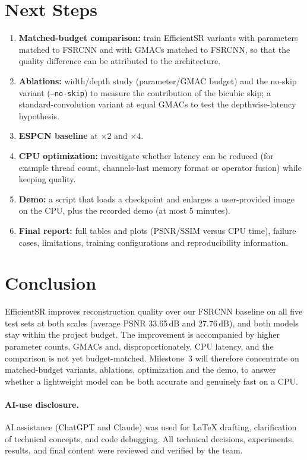 \documentclass[11pt]{article}
\begin{document}
\section{Next Steps}
\label{sec:next}
\begin{enumerate}
    \item \textbf{Matched-budget comparison:} train EfficientSR variants with parameters matched to FSRCNN and with GMACs matched to FSRCNN, so that the quality difference can be attributed to the architecture.
    \item \textbf{Ablations:} width/depth study (parameter/GMAC budget) and the no-skip variant (\texttt{--no-skip}) to measure the contribution of the bicubic skip; a standard-convolution variant at equal GMACs to test the depthwise-latency hypothesis.
    \item \textbf{ESPCN baseline} at $\times2$ and $\times4$.
    \item \textbf{CPU optimization:} investigate whether latency can be reduced (for example thread count, channels-last memory format or operator fusion) while keeping quality.
    \item \textbf{Demo:} a script that loads a checkpoint and enlarges a user-provided image on the CPU, plus the recorded demo (at most 5 minutes).
    \item \textbf{Final report:} full tables and plots (PSNR/SSIM versus CPU time), failure cases, limitations, training configurations and reproducibility information.
\end{enumerate}

\section{Conclusion}
\label{sec:conclusion}
EfficientSR improves reconstruction quality over our FSRCNN baseline on all five test sets at both scales (average PSNR 33.65\,dB and 27.76\,dB), and both models stay within the project budget. The improvement is accompanied by higher parameter counts, GMACs and, disproportionately, CPU latency, and the comparison is not yet budget-matched. Milestone~3 will therefore concentrate on matched-budget variants, ablations, optimization and the demo, to answer whether a lightweight model can be both accurate and genuinely fast on a CPU.

\paragraph{AI-use disclosure.} AI assistance (ChatGPT and Claude) was used for LaTeX drafting, clarification of technical concepts, and code debugging. All technical decisions, experiments, results, and final content were reviewed and verified by the team.



\end{document}
